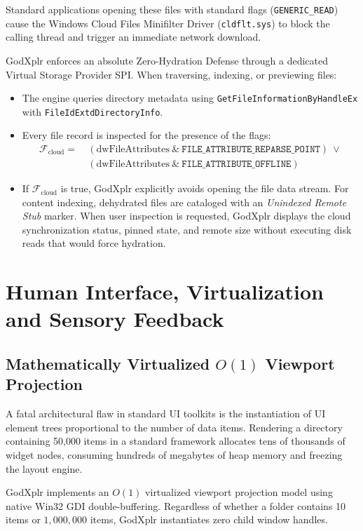 \documentclass[conference]{IEEEtran}
\begin{document}
Standard applications opening these files with standard flags (\texttt{GENERIC\_READ}) cause the Windows Cloud Files Minifilter Driver (\texttt{cldflt.sys}) to block the calling thread and trigger an immediate network download.

GodXplr enforces an absolute Zero-Hydration Defense through a dedicated Virtual Storage Provider SPI. When traversing, indexing, or previewing files:
\begin{itemize}
    \item The engine queries directory metadata using \texttt{GetFileInformationByHandleEx} with \texttt{FileIdExtdDirectoryInfo}.
    \item Every file record is inspected for the presence of the flags:
    \begin{align}
    \mathcal{F}_{\text{cloud}} = &\ (\text{dwFileAttributes} \ \& \ \texttt{FILE\_ATTRIBUTE\_REPARSE\_POINT}) \ \lor \nonumber \\
    &\ (\text{dwFileAttributes} \ \& \ \texttt{FILE\_ATTRIBUTE\_OFFLINE})
    \end{align}
    \item If $\mathcal{F}_{\text{cloud}}$ is true, GodXplr explicitly avoids opening the file data stream. For content indexing, dehydrated files are cataloged with an \textit{Unindexed Remote Stub} marker. When user inspection is requested, GodXplr displays the cloud synchronization status, pinned state, and remote size without executing disk reads that would force hydration.
\end{itemize}

\section{Human Interface, Virtualization and Sensory Feedback}

\subsection{Mathematically Virtualized $O(1)$ Viewport Projection}
A fatal architectural flaw in standard UI toolkits is the instantiation of UI element trees proportional to the number of data items. Rendering a directory containing 50,000 items in a standard framework allocates tens of thousands of widget nodes, consuming hundreds of megabytes of heap memory and freezing the layout engine.

GodXplr implements an $O(1)$ virtualized viewport projection model using native Win32 GDI double-buffering. Regardless of whether a folder contains 10 items or $1,000,000$ items, GodXplr instantiates zero child window handles.
\end{document}
